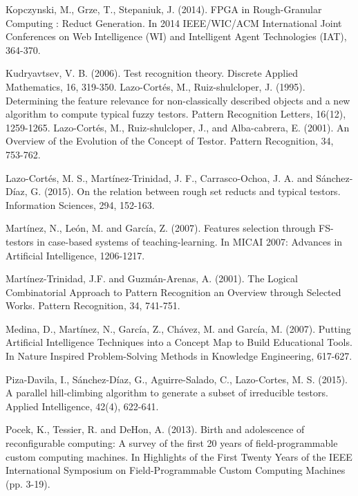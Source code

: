 \documentclass[authoryear,preprint,review,12pt]{elsarticle}
\begin{document}
\begin{thebibliography}{00}
Kopczynski, M., Grze, T., Stepaniuk, J. (2014). FPGA in Rough-Granular Computing : Reduct Generation. In 2014 IEEE/WIC/ACM International Joint Conferences on Web Intelligence (WI) and Intelligent Agent Technologies (IAT), 364-370. 

Kudryavtsev, V. B. (2006). Test recognition theory. Discrete Applied Mathematics, 16, 319-350.
Lazo-Cort\'es, M., Ruiz-shulcloper, J. (1995). Determining the feature relevance for non-classically described objects and a new algorithm to compute typical fuzzy testors. Pattern Recognition Letters, 16(12), 1259-1265.
Lazo-Cort\'es, M., Ruiz-shulcloper, J., and Alba-cabrera, E. (2001). An Overview of the Evolution of the Concept of Testor. Pattern Recognition, 34, 753-762.

Lazo-Cortés, M. S., Mart\'inez-Trinidad, J. F., Carrasco-Ochoa, J. A. and S\'anchez-D\'iaz, G. (2015). On the relation between rough set reducts and typical testors. Information Sciences, 294, 152-163.

Mart\'inez, N., Le\'on, M. and Garc\'ia, Z. (2007). Features selection through FS-testors in case-based systems of teaching-learning. In MICAI 2007: Advances in Artificial Intelligence, 1206-1217.

Mart\'inez-Trinidad, J.F. and Guzm\'an-Arenas, A. (2001). The Logical Combinatorial Approach to Pattern Recognition an Overview through Selected Works. Pattern Recognition, 34, 741-751.

Medina, D., Mart\'inez, N., Garc\'ia, Z., Ch\'avez, M. and Garc\'ia, M. (2007). Putting Artificial Intelligence Techniques into a Concept Map to Build Educational Tools. In Nature Inspired Problem-Solving Methods in Knowledge Engineering, 617-627.

Piza-Davila, I., S\'anchez-D\'iaz, G., Aguirre-Salado, C., Lazo-Cortes, M. S. (2015). A parallel hill-climbing algorithm to generate a subset of irreducible testors. Applied Intelligence, 42(4), 622-641.

Pocek, K., Tessier, R. and DeHon, A. (2013). Birth and adolescence of reconfigurable computing: A survey of the first 20 years of field-programmable custom computing machines. In Highlights of the First Twenty Years of the IEEE International Symposium on Field-Programmable Custom Computing Machines (pp. 3-19).


\end{thebibliography}
\end{document}
